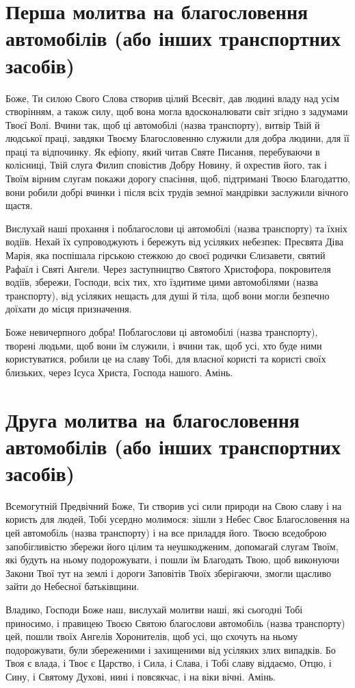 \documentclass[chapters.tex]{subfiles}
\begin{document}
\section{Перша молитва на благословення автомобілів (або інших транспортних засобів)}
Боже, Ти силою Свого Слова створив цілий Всесвіт, дав людині владу над усім створінням, а також силу, щоб вона могла вдосконалювати світ згідно з задумами Твоєї Волі. Вчини так, щоб ці автомобілі (назва транспорту), витвір Твій й людської праці, завдяки Твоєму Благословенню служили для добра людини, для її праці та відпочинку. Як ефіопу, який читав Святе Писання, перебуваючи в колісниці, Твій слуга Филип сповістив Добру Новину, й охрестив його, так і Твоїм вірним слугам покажи дорогу спасіння, щоб, підтримані Твоєю Благодаттю, вони робили добрі вчинки і після всіх трудів земної мандрівки заслужили вічного щастя.

Вислухай наші прохання і поблагослови ці автомобілі (назва транспорту) та їхніх водіїв. Нехай їх супроводжують і бережуть від усіляких небезпек: Пресвята Діва Марія, яка поспішала гірською стежкою до своєї родички Єлизавети, святий Рафаїл і Святі Ангели. Через заступництво Святого Христофора, покровителя водіїв, збережи, Господи, всіх тих, хто їздитиме цими автомобілями (назва транспорту), від усіляких нещасть для душі й тіла, щоб вони могли безпечно доїхати до місця призначення.

Боже невичерпного добра! Поблагослови ці автомобілі (назва транспорту), творені людьми, щоб вони їм служили, і вчини так, щоб усі, хто буде ними користуватися, робили це на славу Тобі, для власної користі та користі своїх близьких, через Ісуса Христа, Господа нашого. Амінь.

\section{Друга молитва на благословення автомобілів (або інших транспортних засобів)}
Всемогутній Предвічний Боже, Ти створив усі сили природи на Свою славу і на користь для людей, Тобі усердно молимося: зішли з Небес Своє Благословення на цей автомобіль (назва транспорту) і на все приладдя його. Твоєю вседоброю запобігливістю збережи його цілим та неушкодженим, допомагай слугам Твоїм, які будуть на ньому подорожувати, і пошли їм Благодать Твою, щоб виконуючи Закони Твої тут на землі і дороги Заповітів Твоїх зберігаючи, змогли щасливо зайти до Небесної батьківщини.

Владико, Господи Боже наш, вислухай молитви наші, які сьогодні Тобі приносимо, і правицею Твоєю Святою благослови автомобіль (назва транспорту) цей, пошли твоїх Ангелів Хоронителів, щоб усі, що схочуть на ньому подорожувати, були збереженими і захищеними від усіляких злих випадків. Бо Твоя є влада, і Твоє є Царство, і Сила, і Слава, і Тобі славу віддаємо, Отцю, і Сину, і Святому Духові, нині і повсякчас, і на віки вічні. Амінь.
\end{document}
